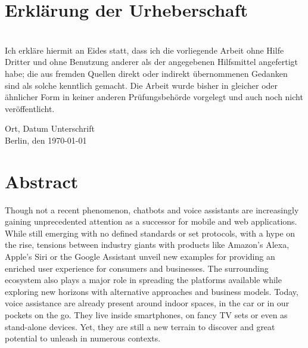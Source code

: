 \chapter*{Erkl{\"a}rung der Urheberschaft}
\\ 
Ich erkläre hiermit an Eides statt, dass ich die vorliegende Arbeit ohne Hilfe Dritter und ohne Benutzung anderer als der angegebenen Hilfsmittel angefertigt habe; die aus fremden Quellen direkt oder indirekt übernommenen Gedanken sind als solche kenntlich gemacht. Die Arbeit wurde bisher in gleicher oder ähnlicher Form in keiner anderen Prüfungsbehörde vorgelegt und auch noch nicht veröffentlicht.


\vspace{4cm}

Ort, Datum \hfill Unterschrift\\
Berlin, den \today


\newpage
\chapter*{Abstract}

Though not a recent phenomenon, chatbots and voice assistants are increasingly gaining unprecedented attention as a successor for mobile and web applications. While still emerging with no defined standards or set protocols, with a hype on the rise, tensions between industry giants with products like Amazon's Alexa, Apple's Siri or the Google Assistant %
unveil new examples for providing an enriched user experience for consumers and businesses. The surrounding ecosystem also plays a major role in spreading the platforms available while exploring new horizons with alternative approaches and business models. Today, voice assistance are already present around indoor spaces, in the car or in our pockets on the go. 
They live inside smartphones, on fancy TV sets or even as stand-alone devices. Yet, they are still a new terrain to discover and great potential to unleash in numerous contexts.\\ 

